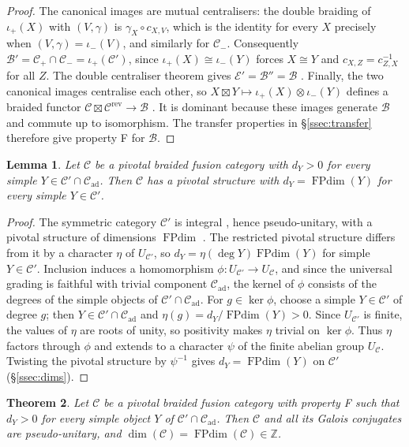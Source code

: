 \documentclass[11pt,oneside]{amsart}
\newtheorem{theorem}{Theorem}[section]
\newtheorem{lemma}[theorem]{Lemma}
\theoremstyle{remark}
\newcommand{\C}{\mathcal C}
\newcommand{\B}{\mathcal B}
\newcommand{\E}{\mathcal E}
\newcommand{\FP}{\operatorname{FPdim}}
\newcommand{\Z}{\mathbb Z}
\newcommand{\ad}{\mathrm{ad}}
\newcommand{\rev}{\mathrm{rev}}
\begin{document}
\begin{proof}
The canonical images are mutual centralisers: the double braiding of
$\iota_+(X)$ with $(V,\gamma)$ is $\gamma_X\circ c_{X,V}$, which is the identity
for every $X$ precisely when $(V,\gamma)=\iota_-(V)$, and similarly for $\C_-$.
Consequently $\B'=\C_+\cap\C_-=\iota_+(\C')$, since $\iota_+(X)\cong\iota_-(Y)$
forces $X\cong Y$ and $c_{X,Z}=c^{-1}_{Z,X}$ for all $Z$. The double centraliser
theorem gives $\E'=\B''=\B$ \cite[Corollary~3.11]{DGNO}. Finally, the two canonical
images centralise each other, so $X\boxtimes Y\mapsto\iota_+(X)\otimes\iota_-(Y)$
defines a braided functor $\C\boxtimes\C^\rev\to\B$ \cite[Proposition~8.6.1]{EGNO}. It
is dominant because these images generate $\B$ and commute up to isomorphism.
The transfer properties in \S\ref{ssec:transfer} therefore give property F for
$\B$.
\end{proof}

\begin{lemma}\label{lem:normalise}
Let $\C$ be a pivotal braided fusion category with $d_Y>0$ for every simple
$Y\in\C'\cap\C_\ad$. Then $\C$ has a pivotal structure with $d_Y=\FP(Y)$ for
every simple $Y\in\C'$.
\end{lemma}

\begin{proof}
The symmetric category $\C'$ is integral \cite[Corollary~2.46]{DGNO}, hence
pseudo-unitary, with a pivotal structure of dimensions $\FP$
\cite[Propositions~8.23, 8.24]{ENO}. The restricted pivotal structure differs from it
by a character $\eta$ of $U_{\C'}$, so $d_Y=\eta(\deg Y)\FP(Y)$ for simple
$Y\in\C'$. Inclusion induces a homomorphism $\phi:U_{\C'}\to U_\C$, and since
the universal grading is faithful with trivial component $\C_\ad$, the kernel of
$\phi$ consists of the degrees of the simple objects of $\C'\cap\C_\ad$. For
$g\in\ker\phi$, choose a simple $Y\in\C'$ of degree $g$; then
$Y\in\C'\cap\C_\ad$ and $\eta(g)=d_Y/\FP(Y)>0$. Since $U_{\C'}$ is finite, the
values of $\eta$ are roots of unity, so positivity makes $\eta$ trivial on
$\ker\phi$. Thus $\eta$ factors through $\phi$ and extends to
a character $\psi$ of the finite abelian group $U_\C$. Twisting the pivotal
structure by $\psi^{-1}$ gives $d_Y=\FP(Y)$ on $\C'$ (\S\ref{ssec:dims}).
\end{proof}

\begin{theorem}\label{thm:degenerate}
Let $\C$ be a pivotal braided fusion category with property F such that
$d_Y>0$ for every simple object $Y$ of $\C'\cap\C_\ad$. Then $\C$ and all its
Galois conjugates are pseudo-unitary, and $\dim(\C)=\FP(\C)\in\Z$.
\end{theorem}
\end{document}
